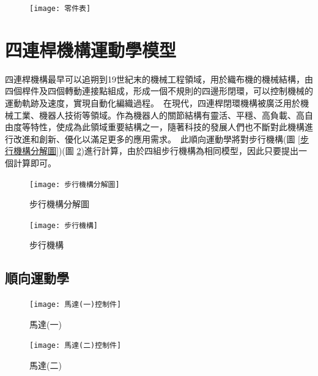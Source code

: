 \begin{figure}[hbt!]
\begin{center}
\texttt{[image: 零件表]}
\label{零件表}
\end{center}
\end{figure}
\newpage

\section{四連桿機構運動學模型}

四連桿機構最早可以追朔到19世紀末的機械工程領域，用於織布機的機械結構，由四個桿件及四個轉動連接點組成，形成一個不規則的四邊形閉環，可以控制機械的運動軌跡及速度，實現自動化編織過程。\
在現代，四連桿閉環機構被廣泛用於機械工業、機器人技術等領域。作為機器人的關節結構有靈活、平穩、高負載、高自由度等特性，使成為此領域重要結構之一，隨著科技的發展人們也不斷對此機構進行改進和創新、優化以滿足更多的應用需求。\
此順向運動學將對步行機構(圖 \ref{步行機構分解圖})(圖 \ref{步行機構})進行計算，由於四組步行機構為相同模型，因此只要提出一個計算即可。\\
\begin{figure}[htbp]
  \begin{minipage}[t]{0.45\linewidth}
    \centering
    \texttt{[image: 步行機構分解圖]}
    \caption{步行機構分解圖}
    \label{步行機構分解圖}
  \end{minipage}
  \hfill
  \begin{minipage}[t]{0.45\linewidth}
    \centering
    \texttt{[image: 步行機構]}
    \caption{步行機構}
    \label{步行機構}
  \end{minipage}
\end{figure}
\newpage

\subsection{順向運動學}
\begin{figure}[htbp]
  \begin{minipage}[t]{0.5\linewidth}
    \centering
    \texttt{[image: 馬達(一)控制件]}
    \caption{馬達(一)}
    \label{馬達(一)控制件}
  \end{minipage}
  \hfill
  \begin{minipage}[t]{0.5\linewidth}
    \centering
    \texttt{[image: 馬達(二)控制件]}
    \caption{馬達(二)}
    \label{馬達(二)控制件}
  \end{minipage}
\end{figure}

